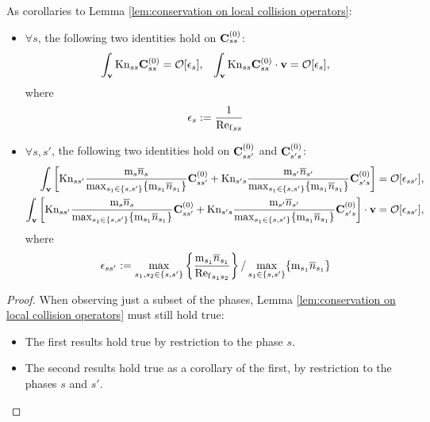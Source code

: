     \begin{corollary}\label{cor:phase-restricted conservation on local collision operators}
        As corollaries to Lemma \ref{lem:conservation on local collision operators}:
        \begin{itemize}
            \item  $\forall s$, the following two identities hold on $\mathbf{C}_{ss}^{(0)}$:
            \begin{align}
                \int_{\mathbf{v}}\mathrm{Kn}_{ss}\mathbf{C}_{ss}^{(0)}  =  \mathcal{O}[\epsilon_{s}],  &&
                \int_{\mathbf{v}}\mathrm{Kn}_{ss}\mathbf{C}_{ss}^{(0)}\cdot\mathbf{v}  =  \mathcal{O}[\epsilon_{s}],
            \end{align}
            where
            \begin{equation}
                \epsilon_{s}  :=  \frac{1}{{\mathrm{Re}_{\mathrm{f}}}_{ss}}
            \end{equation}
            \item  $\forall s, s'$, the following two identities hold on $\mathbf{C}_{ss'}^{(0)}$ and $\mathbf{C}_{s's}^{(0)}$:
            \begin{align}
                \int_{\mathbf{v}}\left[\mathrm{Kn}_{ss'}\frac{\mathrm{m}_{s}\overline{n}_{s}}{\max_{s_{1} \in \{s, s'\}}\{\mathrm{m}_{s_{1}}\overline{n}_{s_{1}}\}}\mathbf{C}_{ss'}^{(0)} + \mathrm{Kn}_{s's}\frac{\mathrm{m}_{s'}\overline{n}_{s'}}{\max_{s_{1} \in \{s, s'\}}\{\mathrm{m}_{s_{1}}\overline{n}_{s_{1}}\}}\mathbf{C}_{s's}^{(0)}\right]  &=  \mathcal{O}[\epsilon_{ss'}],  \\
                \int_{\mathbf{v}}\left[\mathrm{Kn}_{ss'}\frac{\mathrm{m}_{s}\overline{n}_{s}}{\max_{s_{1} \in \{s, s'\}}\{\mathrm{m}_{s_{1}}\overline{n}_{s_{1}}\}}\mathbf{C}_{ss'}^{(0)} + \mathrm{Kn}_{s's}\frac{\mathrm{m}_{s'}\overline{n}_{s'}}{\max_{s_{1} \in \{s, s'\}}\{\mathrm{m}_{s_{1}}\overline{n}_{s_{1}}\}}\mathbf{C}_{s's}^{(0)}\right]\cdot\mathbf{v}  &=  \mathcal{O}[\epsilon_{ss'}],
            \end{align}
            where
            \begin{equation}
                \epsilon_{ss'}  :=  \max_{s_{1}, s_{2} \in \{s, s'\}}\left\{\frac{\mathrm{m}_{s_{1}}\overline{n}_{s_{1}}}{{\mathrm{Re}_{\mathrm{f}}}_{s_{1}s_{2}}}\right\}/\max_{s_{1} \in \{s, s'\}}\{\mathrm{m}_{s_{1}}\overline{n}_{s_{1}}\}
            \end{equation}
        \end{itemize}
    \end{corollary}
    \begin{proof}
        When observing just a subset of the phases, Lemma \ref{lem:conservation on local collision operators} must still hold true:
        \begin{itemize}
            \item  The first results hold true by restriction to the phase $s$.
            \item  The second results hold true as a corollary of the first, by restriction to the phases $s$ and $s'$.
        \end{itemize}
    \end{proof}
